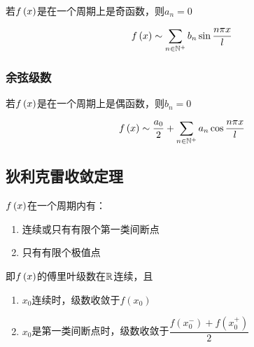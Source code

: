 \documentclass{article}
\begin{document}
若$f\left(x\right)$是在一个周期上是奇函数，则$a_n=0$

\[f\left(x\right)\sim\sum_{n\in\mathbb N^+}b_n\sin\frac{n\pi x}l\]

\subsubsection{余弦级数}

若$f\left(x\right)$是在一个周期上是偶函数，则$b_n=0$

\[f\left(x\right)\sim\frac{a_0}2+\sum_{n\in\mathbb N^+}a_n\cos\frac{n\pi x}l\]

\subsection{狄利克雷收敛定理}

$f\left(x\right)$在一个周期内有：

\begin{enumerate}
    \item 连续或只有有限个第一类间断点
    \item 只有有限个极值点
\end{enumerate}

即$f\left(x\right)$的傅里叶级数在$\mathbb R$连续，且

\begin{enumerate}
    \item $x_0$连续时，级数收敛于$f(x_0)$
    \item $x_0$是第一类间断点时，级数收敛于$\dfrac{f(x_0^-)+f(x_0^+)}2$
\end{enumerate}
\end{document}
